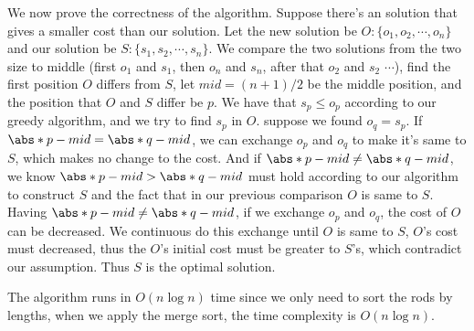 \documentclass{article}
\begin{document}
\begin{Question}
\begin{Subquestion}
\begin{answer}
We now prove the correctness of the algorithm. Suppose there's an solution that gives a 
smaller cost than our solution. Let the new solution be $O:\{o_1, o_2, \cdots, o_n\}$ and our 
solution be $S:\{s_1, s_2, \cdots, s_n\}$. We compare the two solutions from the two size to middle (first $o_1$ and 
$s_1$, then $o_n$ and $s_n$, after that $o_2$ and $s_2$ $\cdots$), find the first position $O$ differs from 
$S$, let $mid = (n + 1)/2$ be the middle position, and the position that $O$ and $S$ differ be $p$.
We have that $s_p \le o_p$ according to our greedy algorithm, and we try to find $s_p$ in $O$. suppose we 
found $o_q = s_p$. If $\abs*{p-mid}=\abs*{q-mid}$, we can exchange $o_p$ and $o_q$ to make it's same to $S$,
which makes no change to the cost. And if $\abs*{p-mid}\ne\abs*{q-mid}$, we know $\abs*{p-mid}>\abs*{q-mid}$
 must hold according to our algorithm to construct $S$ and the fact that in our previous comparison $O$ is same to $S$.
Having $\abs*{p-mid}\ne\abs*{q-mid}$, if we exchange $o_p$ and $o_q$, the cost of $O$ can be decreased.
We continuous do this exchange until $O$ is same to $S$, $O$'s cost must decreased, thus the $O$'s initial cost
 must be greater to $S$'s, which contradict our assumption. Thus $S$ is the optimal solution.

 The algorithm runs in $O(n\log n)$ time since we only need to sort the rods by lengths, when we apply 
 the merge sort, the time complexity is $O(n\log n)$.
\end{answer}
\end{Subquestion}

\end{Question}
\end{document}

